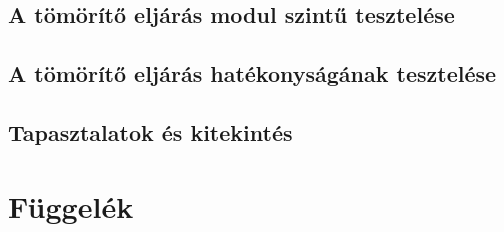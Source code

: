 \documentclass[oneside,titlepage,12pt,a4paper]{report}
\begin{document}
\section{A tömörítő eljárás modul szintű tesztelése}

\section{A tömörítő eljárás hatékonyságának tesztelése}

\section{Tapasztalatok és kitekintés}

\chapter{Függelék}
\end{document}
